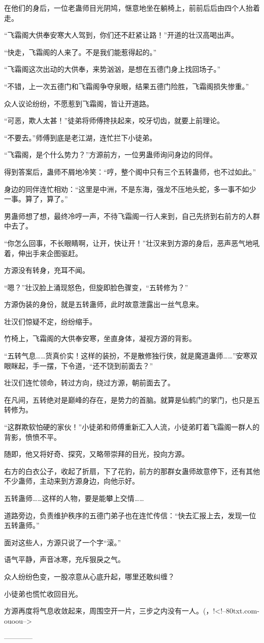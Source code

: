 \begin{this_body}
在他们的身后，一位老蛊师目光阴鸠，惬意地坐在躺椅上，前前后后由四个人抬着走。

“飞霜阁大供奉安寒大人驾到，你们还不赶紧让路！”开道的壮汉高喝出声。

“快走，飞霜阁的人来了。不是我们能惹得起的。”

“飞霜阁这次出动的大供奉，来势汹汹，是想在五德门身上找回场子。”

“不错，上一次五德门和飞霜阁争夺泉眼，结果五德门险胜，飞霜阁损失惨重。”

众人议论纷纷，不愿惹到飞霜阁，皆让开道路。

“可恶，欺人太甚！”徒弟将师傅搀扶起来，咬牙切齿，就要上前理论。

“不要去。”师傅到底是老江湖，连忙拦下小徒弟。

“飞霜阁，是个什么势力？”方源前方，一位男蛊师询问身边的同伴。

得到答案后，蛊师不屑地冷笑：“哼，整个阁中只有三个五转蛊师，也不过如此。”

身边的同伴连忙相劝：“这里是中洲，不是东海，强龙不压地头蛇，多一事不如少一事。算了，算了。”

男蛊师想了想，最终冷哼一声，不待飞霜阁一行人来到，自己先挤到右前方的人群中去了。

“你怎么回事，不长眼睛啊，让开，快让开！”壮汉来到方源的身后，恶声恶气地吼着，伸出手来企图驱赶。

方源没有转身，充耳不闻。

“嗯？”壮汉脸上涌现怒色，但旋即脸色骤变，“五转修为？”

方源伪装的身份，就是五转蛊师，此时故意泄露出一丝气息来。

壮汉们惊疑不定，纷纷缩手。

竹椅上，飞霜阁的大供奉安寒，坐直身体，凝视方源的背影。

“五转气息……货真价实！这样的装扮，不是散修独行侠，就是魔道蛊师……”安寒双眼眯起，手一摆，下令道，“还不饶到前面去？”

壮汉们连忙领命，转过方向，绕过方源，朝前面去了。

在凡间，五转绝对是巅峰的存在，是势力的首脑。就算是仙鹤门的掌门，也只是五转修为。

“这群欺软怕硬的家伙！”小徒弟和师傅重新汇入人流，小徒弟盯着飞霜阁一群人的背影，愤愤不平。

随即，他又将好奇、探究，又略带崇拜的目光，投向方源。

右方的白衣公子，收起了折扇，下了花豹，前方的那群女蛊师故意停下，还有其他不少蛊师，主动来到方源身边，向他示好。

五转蛊师……这样的人物，要是能攀上交情……

道路旁边，负责维护秩序的五德门弟子也在连忙传信：“快去汇报上去，发现一位五转蛊师。”

面对这些人，方源只说了一个字“滚。”

语气平静，声音冰寒，充斥狠戾之气。

众人纷纷色变，一股凉意从心底升起，哪里还敢纠缠？

小徒弟也慌忙收回目光。

方源再度将气息收敛起来，周围空开一片，三步之内没有一人。(，!<!--80txt.com-ouoou-->

------------

\end{this_body}

